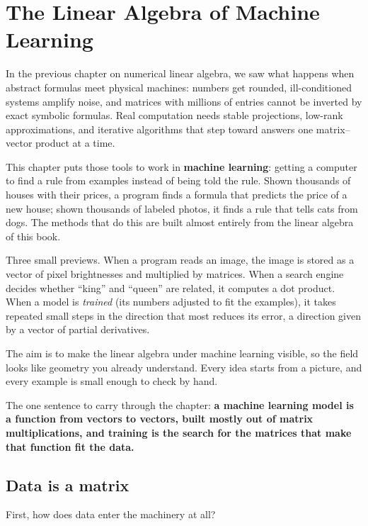 \chapter{The Linear Algebra of Machine Learning}

In the previous chapter on numerical linear algebra, we saw what happens when abstract
formulas meet physical machines: numbers get rounded, ill-conditioned systems amplify
noise, and matrices with millions of entries cannot be inverted by exact symbolic
formulas. Real computation needs stable projections, low-rank approximations, and
iterative algorithms that step toward answers one matrix--vector product at a time.

This chapter puts those tools to work in \textbf{machine learning}: getting a computer to
find a rule from examples instead of being told the rule. Shown thousands of houses with
their prices, a program finds a formula that predicts the price of a new house; shown
thousands of labeled photos, it finds a rule that tells cats from dogs. The methods that do
this are built almost entirely from the linear algebra of this book.

Three small previews. When a program reads an image, the image is stored as a vector of
pixel brightnesses and multiplied by matrices. When a search engine decides whether
``king'' and ``queen'' are related, it computes a dot product. When a model is
\emph{trained} (its numbers adjusted to fit the examples), it takes repeated small steps in
the direction that most reduces its error, a direction given by a vector of partial
derivatives.

The aim is to make the linear algebra under machine learning visible, so the field looks
like geometry you already understand. Every idea starts from a picture, and every example is
small enough to check by hand.

\begin{focusbox}
The one sentence to carry through the chapter: \textbf{a machine learning model
is a function from vectors to vectors, built mostly out of matrix multiplications, and
training is the search for the matrices that make that function fit the data.}
\end{focusbox}

\section{Data is a matrix}
\label{ch34:data-matrix}

First, how does data enter the machinery at all?

